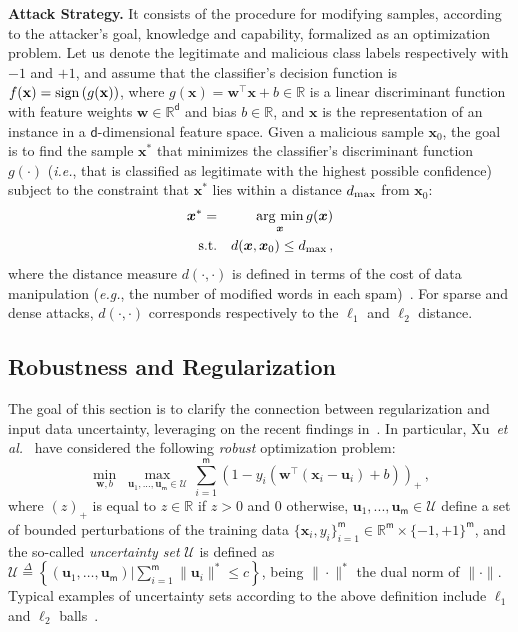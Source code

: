 \documentclass[runningheads,a4paper]{llncs}
\newcommand{\ie}{\emph{i.e.}}
\newcommand{\eg}{\emph{e.g.}}
\newcommand{\etal}{\emph{et al.}}
\newcommand{\vct}[1]{\ensuremath{\boldsymbol{#1}}}
\newcommand{\set}[1]{\ensuremath{\mathcal{#1}}}
\newcommand{\con}[1]{\ensuremath{\mathsf{#1}}}
\newcommand{\T}{\ensuremath{\top}}
\newcommand{\argmin}{\operatornamewithlimits{\arg\,\min}}
\newcommand{\myparagraph}[1]{\smallskip \noindent \textbf{#1.}}
\begin{document}
\myparagraph{Attack Strategy} It consists of the procedure for modifying samples, according to the attacker's goal, knowledge and capability, formalized as an optimization problem. 
Let us denote the legitimate and malicious class labels respectively with $-1$ and $+1$, and assume that the classifier's decision function is $f(\mathbf x) = {\rm sign} \left ( g(\mathbf x) \right )$, where $g(\mathbf x) = \vct w^{\T} \vct x + b \in \mathbb R$ is a linear discriminant function with feature weights $\vct w \in \mathbb R^{\con d}$ and bias $b \in \mathbb R$, and $\mathbf x$ is the representation of an instance in a $\con d$-dimensional feature space. 
%
Given a malicious sample $\vct x_0$, the goal is to find the sample $\vct x^*$ that minimizes the classifier's discriminant function $g(\cdot)$ (\ie, that is classified as legitimate with the highest possible confidence) subject to the constraint that $\vct x^*$ lies within a distance $d_{\rm max}$ from $\vct x_0$:
%
\begin{eqnarray}
\label{eq:ev1}
\vct x^* = &&  \argmin_{\vct x}  g(\vct x ) \\
\label{eq:ev2}
{\rm s. t.} && d(\vct x, \vct x_0) \leq d_{\rm max} \, ,
\end{eqnarray}
where the distance measure $d(\cdot,\cdot)$ is defined in terms of the cost of data manipulation (\eg, the number of modified words in each spam)~\cite{dalvi04,lowd05,biggio13-ecml,biggio14-tkde,zhang16-tcyb}. For sparse and dense attacks, $d(\cdot,\cdot)$ corresponds respectively to the $\ell_{1}$ and $\ell_{2}$ distance.


\subsection{Robustness and Regularization}
\label{sect:RobustnessAndRegularization}

The goal of this section is to clarify the connection between regularization and input data uncertainty, leveraging on the recent findings in~\cite{xu09,sra11,livni12}.
In particular, Xu~\etal{}~\cite{xu09} have considered the following \emph{robust} optimization problem: 
\begin{equation}
\label{eq:xu}
 \min_{\vct w,b} \; \max_{\vct u_1,..., \vct u_{\con m} \in \set U} \, \sum_{i=1}^{\con m} \left(1- y_i( \vct w^{\T} (\vct x_i -\vct u_i) + b)\right)_{+} \, ,
\end{equation}
where $\left( z \right)_{+}$ is equal to $z \in \mathbb R$ if $z > 0$ and $0$ otherwise, $\vct u_1,..., \vct u_{\con m} \in \set U$ define a set of bounded perturbations of the training data $\{\vct x_{i}, y_{i}\}_{i=1}^{\con m} \in \mathbb R^{\con m} \times \{-1,+1\}^{\con m}$, and the so-called \emph{uncertainty set} $\set U$ is defined as $\set U \overset{\Delta}{=} \left \{ (\vct u_1, \ldots , \vct u_{\con m}) | \sum_{i=1}^{\con m} \| \vct u_i \|^*  \leq c \right \}$, being $\| \cdot \|^*$ the dual norm of $\| \cdot \|$.
Typical examples of uncertainty sets according to the above definition include $\ell_{1}$ and $\ell_{2}$ balls~\cite{xu09,sra11}.
\end{document}
